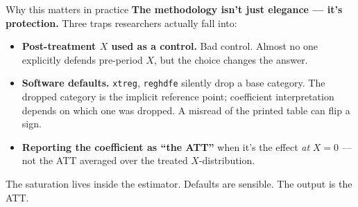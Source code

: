 \documentclass[aspectratio=169,11pt]{beamer}
\begin{document}
\begin{frame}{Why this matters in practice}
\footnotesize
\textbf{The methodology isn't just elegance --- it's protection.} \;Three traps researchers actually fall into:

\vspace{0.5em}
\begin{itemize}\setlength\itemsep{4pt}
  \item \textbf{Post-treatment $X$ used as a control.} \;Bad control. \;Almost no one explicitly defends pre-period $X$, but the choice changes the answer.
  \item \textbf{Software defaults.} \;\texttt{xtreg}, \texttt{reghdfe} silently drop a base category. \;The dropped category is the implicit reference point; coefficient interpretation depends on which one was dropped. \;A misread of the printed table can flip a sign.
  \item \textbf{Reporting the coefficient as ``the ATT''} when it's the effect \textit{at} $X=0$ --- not the ATT averaged over the treated $X$-distribution.
\end{itemize}

\vspace{0.5em}
 \;The saturation lives inside the estimator. \;Defaults are sensible. \;The output is the ATT.

\vspace{0.4em}
\end{frame}
\end{document}
